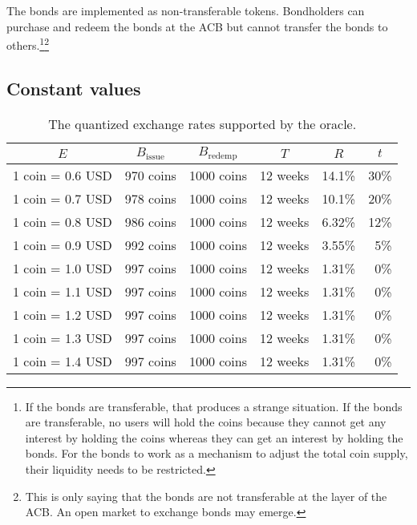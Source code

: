 \documentclass[dvipdfmx,a4paper]{article}
\begin{document}
The bonds are implemented as non-transferable tokens. Bondholders can purchase and redeem the bonds at the ACB but cannot transfer the bonds to others.\footnote{ If the bonds are transferable, that produces a strange situation. If the bonds are transferable, no users will hold the coins because they cannot get any interest by holding the coins whereas they can get an interest by holding the bonds. For the bonds to work as a mechanism to adjust the total coin supply, their liquidity needs to be restricted.}\footnote{This is only saying that the bonds are not transferable at the layer of the ACB. An open market to exchange bonds may emerge.}

\subsection{Constant values}

\begin{table}[htb]
\begin{center}
\caption{The quantized exchange rates supported by the oracle.}\vspace{2ex}
\begin{tabular}{rrrrrr}\hline
\multicolumn{1}{c}{$E$} & \multicolumn{1}{c}{$B_{\mathrm{issue}}$} & \multicolumn{1}{c}{$B_{\mathrm{redemp}}$} & \multicolumn{1}{c}{$T$} & \multicolumn{1}{c}{$R$} & \multicolumn{1}{c}{$t$}\\\hline
1 coin = 0.6 USD & 970 coins & 1000 coins & 12 weeks & 14.1\% & 30\%\\
1 coin = 0.7 USD & 978 coins & 1000 coins & 12 weeks & 10.1\% & 20\%\\
1 coin = 0.8 USD & 986 coins & 1000 coins & 12 weeks & 6.32\% & 12\%\\
1 coin = 0.9 USD & 992 coins & 1000 coins & 12 weeks & 3.55\% & 5\%\\
1 coin = 1.0 USD & 997 coins & 1000 coins & 12 weeks & 1.31\% & 0\%\\
1 coin = 1.1 USD & 997 coins & 1000 coins & 12 weeks & 1.31\% & 0\%\\
1 coin = 1.2 USD & 997 coins & 1000 coins & 12 weeks & 1.31\% & 0\%\\
1 coin = 1.3 USD & 997 coins & 1000 coins & 12 weeks & 1.31\% & 0\%\\
1 coin = 1.4 USD & 997 coins & 1000 coins & 12 weeks & 1.31\% & 0\%\\\hline
\end{tabular}
\label{table1}
\end{center}
\end{table}
\end{document}
